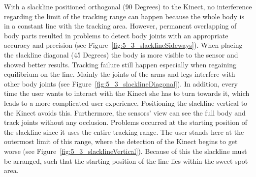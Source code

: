 With a slackline positioned orthogonal (90 Degrees) to the Kinect, no interference regarding the limit of the tracking range can happen because the whole body is in a constant line with the tracking area. However, permanent overlapping of body parts resulted in problems to detect body joints with an appropriate accuracy and precision (see Figure~\ref{fig:5_3_slacklineSideways}).
When placing the slackline diagonal (45 Degrees) the body is more visible to the sensor and showed better results.
Tracking failure still happen especially when regaining equilibrium on the line. Mainly the joints of the arms and legs interfere with other body joints (see Figure~\ref{fig:5_3_slacklineDiagonal}).
In addition, every time the user wants to interact with the Kinect she has to turn towards it, which leads to a more complicated user experience.
Positioning the slackline vertical to the Kinect avoids this. Furthermore, the sensors' view can see the full body and track joints without any occlusion.
Problems occurred at the starting position of the slackline since it uses the entire tracking range.
The user stands here at the outermost limit of this range, where the detection of the Kinect begins to get worse (see Figure~\ref{fig:5_3_slacklineVertical}).
Because of this the slackline must be arranged, such that the starting position of the line lies within the sweet spot area.
